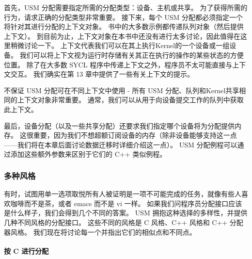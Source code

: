 首先，USM 分配需要指定所需的分配类型：设备、主机或共享。 为了获得所需的行为，请求正确的分配类型非常重要。 
接下来，每个 USM 分配都必须指定一个将针对其进行分配的上下文对象。 书中的大多数示例都传递队列对象（然后提供上下文）。 
到目前为止，上下文对象在本书中还没有进行太多讨论，因此值得在这里稍微讨论一下。 
上下文代表我们可以在其上执行Kernel的一个设备或一组设备。 
我们可以将上下文视为运行时存储有关其正在执行的操作的某些状态的方便位置。 
除了在大多数 SYCL 程序中传递上下文之外，程序员不太可能直接与上下文交互。 
我们确实在第 13 章中提供了一些有关上下文的提示。

不保证 USM 分配可在不同上下文中使用 - 所有 USM 分配、队列和Kernel共享相同的上下文对象非常重要。 
通常，我们可以从用于向设备提交工作的队列中获取此上下文。

最后，设备分配（以及一些共享分配）还要求我们指定哪个设备将为分配提供内存。 
这很重要，因为我们不想超额订阅设备的内存（除非设备能够支持这一点——我们将在本章后面讨论数据迁移时详细介绍这一点）。 
USM 分配例程可以通过添加这些额外参数来区别于它们的 C++ 类似例程。

\subsubsection{多种风格}
有时，试图用单一选项取悦所有人被证明是一项不可能完成的任务，就像有些人喜欢咖啡而不是茶，或者 emacs 而不是 vi 一样。 
如果我们问程序员分配接口应该是什么样子，我们会得到几个不同的答案。 
USM 拥抱这种选择的多样性，并提供几种不同风格的分配接口。 
这些不同的风格是 C 风格、C++ 风格和 C++ 分配器风格。 我们现在将讨论每一个并指出它们的相似点和不同点。

\paragraph{按 C 进行分配}

